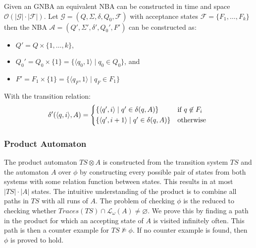 \begin{definition}
Given an GNBA an equivalent NBA can be constructed in time and space $\mathcal{O}(|\mathcal{G}|\cdot|\mathcal{F}|)$. Let $\mathcal{G}=(Q,\Sigma,\delta,Q_0,\mathcal{F})$ with acceptance states $\mathcal{F}=\{F_1,\ldots,F_k\}$ then the NBA $\mathcal{A}=(Q',\Sigma',\delta',Q_0',F')$ can be constructed as:
\begin{itemize}
    \item $Q'=Q\times \{1,\ldots,k\}$,
    \item $Q_0'=Q_0 \times \{1\} = \{\langle q_0,1 \rangle \mid q_0 \in Q_0\}$, and
    \item $F'=F_1 \times \{1\} = \{\langle q_F,1 \rangle \mid q_F \in F_1\}$
\end{itemize}
With the transition relation:
\begin{equation*}
    \delta'(\langle q,i \rangle, A)=
    \begin{cases*}
      \{\langle q',i \rangle \mid q' \in \delta(q,A)\} & if $q \not\in F_i$ \\
      \{\langle q',i+1 \rangle \mid q' \in \delta(q,A)\}        & otherwise
    \end{cases*}
\end{equation*}
\end{definition}

\subsubsection{Product Automaton}
\label{sec:product-automaton}
The product automaton $TS \otimes A$ is constructed from the transition system $TS$ and the automaton $A$ over $\phi$ by constructing every possible pair of states from both systems with some relation function between states. This results in at most $|TS|\cdot |A|$ states. The intuitive understanding of the product is to combine all paths in $TS$ with all runs of $A$. The problem of checking $\phi$ is the reduced to checking whether $Traces(TS) \cap \mathcal{L_\omega}(A) \neq \varnothing$. We prove this by finding a path in the product for which an accepting state of $A$ is visited infinitely often. This path is then a counter example for $TS \not\models \phi$. If no counter example is found, then $\phi$ is proved to hold.

